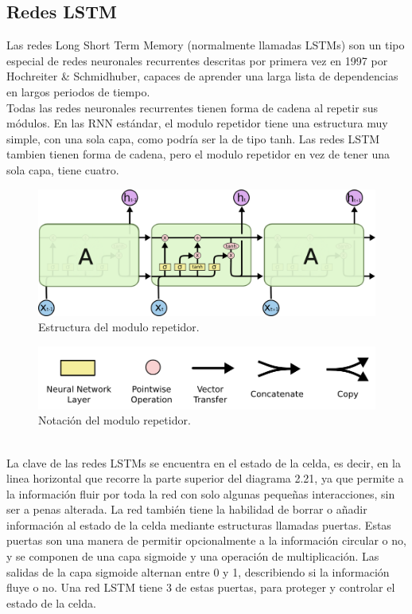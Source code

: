 \subsection{Redes LSTM}
Las redes Long Short Term Memory (normalmente llamadas LSTMs) son un tipo especial de redes neuronales recurrentes descritas por primera vez en 1997 por Hochreiter \& Schmidhuber, capaces de aprender una larga lista de dependencias en largos periodos de tiempo.\\
Todas las redes neuronales recurrentes tienen forma de cadena al repetir sus módulos. En las RNN estándar, el modulo repetidor tiene una estructura muy simple, con una sola capa, como podría ser la de tipo tanh. Las redes LSTM tambien tienen forma de cadena, pero el modulo repetidor en vez de tener una sola capa, tiene cuatro.
\begin{figure}[htp]
\centering
\includegraphics[scale=0.35]{images/LSTM3-chain.png}
\caption{Estructura del modulo repetidor.}
\end{figure}
\begin{figure}[htp]
\centering
\includegraphics[scale=0.2]{images/LSTM2-notation.png}
\caption{Notación del modulo repetidor.}
\end{figure}
\\La clave de las redes LSTMs se encuentra en el estado de la celda, es decir, en la linea horizontal que recorre la parte superior del diagrama 2.21, ya que permite a la información fluir por toda la red con solo algunas pequeñas interacciones, sin ser a penas alterada.
La red también tiene la habilidad de borrar o añadir información al estado de la celda mediante estructuras llamadas puertas. Estas puertas son una manera de permitir opcionalmente a la información circular o no, y se componen de una capa sigmoide y una operación de multiplicación. Las salidas de la capa sigmoide alternan entre 0 y 1, describiendo si la información fluye o no. Una red LSTM tiene 3 de estas puertas, para proteger y controlar el estado de la celda.\\\\
